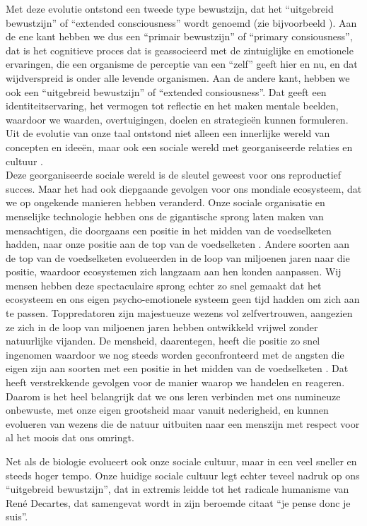 \documentclass[
  11pt,
]{book}
\begin{document}
Met deze evolutie ontstond een tweede type bewustzijn, dat het ``uitgebreid bewustzijn'' of ``extended consciousness'' wordt genoemd (zie bijvoorbeeld \citet{capraLuisi2014}). Aan de ene kant hebben we dus een ``primair bewustzijn'' of ``primary consiousness'', dat is het cognitieve proces dat is geassocieerd met de zintuiglijke en emotionele ervaringen, die een organisme de perceptie van een ``zelf'' geeft hier en nu, en dat wijdverspreid is onder alle levende organismen. Aan de andere kant, hebben we ook een ``uitgebreid bewustzijn'' of ``extended consiousness''. Dat geeft een identiteitservaring, het vermogen tot reflectie en het maken mentale beelden, waardoor we waarden, overtuigingen, doelen en strategieën kunnen formuleren. Uit de evolutie van onze taal ontstond niet alleen een innerlijke wereld van concepten en ideeën, maar ook een sociale wereld met georganiseerde relaties en cultuur \citep{capraLuisi2014}.\\
Deze georganiseerde sociale wereld is de sleutel geweest voor ons reproductief succes. Maar het had ook diepgaande gevolgen voor ons mondiale ecosysteem, dat we op ongekende manieren hebben veranderd. Onze sociale organisatie en menselijke technologie hebben ons de gigantische sprong laten maken van mensachtigen, die doorgaans een positie in het midden van de voedselketen hadden, naar onze positie aan de top van de voedselketen \citep{Harari2015}. Andere soorten aan de top van de voedselketen evolueerden in de loop van miljoenen jaren naar die positie, waardoor ecosystemen zich langzaam aan hen konden aanpassen. Wij mensen hebben deze spectaculaire sprong echter zo snel gemaakt dat het ecosysteem en ons eigen psycho-emotionele systeem geen tijd hadden om zich aan te passen. Toppredatoren zijn majestueuze wezens vol zelfvertrouwen, aangezien ze zich in de loop van miljoenen jaren hebben ontwikkeld vrijwel zonder natuurlijke vijanden. De mensheid, daarentegen, heeft die positie zo snel ingenomen waardoor we nog steeds worden geconfronteerd met de angsten die eigen zijn aan soorten met een positie in het midden van de voedselketen \citep{Harari2015}. Dat heeft verstrekkende gevolgen voor de manier waarop we handelen en reageren. Daarom is het heel belangrijk dat we ons leren verbinden met ons numineuze onbewuste, met onze eigen grootsheid maar vanuit nederigheid, en kunnen evolueren van wezens die de natuur uitbuiten naar een menszijn met respect voor al het moois dat ons omringt.

Net als de biologie evolueert ook onze sociale cultuur, maar in een veel sneller en steeds hoger tempo. Onze huidige sociale cultuur legt echter teveel nadruk op ons ``uitgebreid bewustzijn'', dat in extremis leidde tot het radicale humanisme van René Decartes, dat samengevat wordt in zijn beroemde citaat ``je pense donc je suis''.
\end{document}
